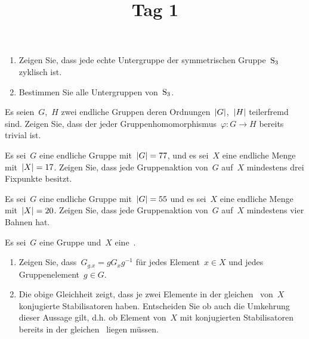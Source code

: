 \documentclass{scrartcl}
\title{Tag 1}
\author{}
\date{}
\begin{document}
\maketitle
\vspace{-6em}

\begin{exercise}
  \leavevmode
  \begin{enumerate}
    \item
      Zeigen Sie, dass jede echte Untergruppe der symmetrischen Gruppe~$\operatorname{S}_3$ zyklisch ist.
    \item
      Bestimmen Sie alle Untergruppen von~$\operatorname{S}_3$.
  \end{enumerate}
\end{exercise}

\begin{exercise}
  Es seien~$G$,~$H$ zwei endliche Gruppen deren Ordnungen~$\lvert G\rvert$,~$\lvert H\rvert$ teilerfremd sind.
  Zeigen Sie, dass der jeder Gruppenhomomorphismus~$\varphi \colon G \to H$ bereits trivial ist.
\end{exercise}

\begin{exercise}
  Es sei~$G$ eine endliche Gruppe mit~$\lvert G\rvert = 77$, und es sei~$X$ eine endliche Menge mit~$\lvert X\rvert = 17$.
  Zeigen Sie, dass jede Gruppenaktion von~$G$ auf~$X$ mindestens drei Fixpunkte besitzt.
\end{exercise}

\begin{exercise}
  Es sei~$G$ eine endliche Gruppe mit~$\lvert G\rvert = 55$ und es sei~$X$ eine endliche Menge mit~$\lvert X\rvert = 20$.
  Zeigen Sie, dass jede Gruppenaktion von~$G$ auf~$X$ mindestens vier Bahnen hat.
\end{exercise}

\begin{exercise}
  Es sei~$G$ eine Gruppe und~$X$ eine~.
  \begin{enumerate}
    \item
      Zeigen Sie, dass~$G_{g.x} = g G_x g^{-1}$ für jedes Element~$x \in X$ und jedes Gruppenelement~$g \in G$.
    \item
      Die obige Gleichheit zeigt, dass je zwei Elemente in der gleichen~ von~$X$ konjugierte Stabilisatoren haben.
      Entscheiden Sie ob auch die Umkehrung dieser Aussage gilt, d.h. ob Element von~$X$ mit konjugierten Stabilisatoren bereits in der gleichen~ liegen müssen.
  \end{enumerate}
\end{exercise}
\end{document}
